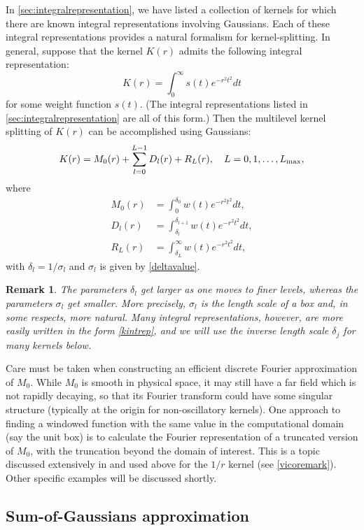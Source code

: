 \documentclass[final,letterpaper]{siamart171218}
\newtheorem{remark}[theorem]{Remark}
\newcommand{\be}{\begin{equation}}
\newcommand{\ee}{\end{equation}}
\newcommand{\ba}{\begin{aligned}}
\newcommand{\ea}{\end{aligned}}
\begin{document}
In \cref{sec:integralrepresentation}, we have listed a collection of
kernels for which there are known integral
representations involving Gaussians. Each of these integral representations provides a
natural formalism for kernel-splitting.
In general, suppose that the kernel $K(r)$ admits the following integral representation:
\be \label{kintrep}
K(r)=\int_0^\infty s(t)e^{-r^2t^2}dt
\ee
for some weight function $s(t)$.
(The integral representations
listed in \cref{sec:integralrepresentation} are all of this form.) 
Then the multilevel kernel splitting of $K(r)$ can be accomplished using Gaussians:
\be\label{generalkernelsplitting}
K(r)=M_0(r)+\sum_{l=0}^{L-1}D_l(r)+R_L(r), \quad L=0,1,\ldots,L_{\rm max},
\ee
where
\be
\ba
M_0(r)&=\int_0^{\delta_0}w(t)e^{-r^2t^2}dt,\\
D_l(r)&=\int_{\delta_{l}}^{\delta_{l+1}} w(t)e^{-r^2t^2}dt,\\
R_L(r)&=\int_{\delta_{L}}^\infty w(t)e^{-r^2t^2}dt,
\ea
\ee
with $\delta_l = 1/\sigma_l$ and $\sigma_l$ is given by \eqref{deltavalue}.

\begin{remark} \label{delta_vs_sigma}
The parameters $\delta_l$ get {\em larger} as one moves to finer levels,
whereas the parameters $\sigma_l$ get smaller. 
More precisely, 
$\sigma_l$ is the length scale of a box and, in some respects, more natural. 
Many integral representations, however,
are more easily written in the form \eqref{kintrep}, and we will use the inverse
length scale $\delta_j$ for many kernels below.
\end{remark}

Care must be taken when constructing an efficient discrete
Fourier approximation of $M_0$. While $M_0$ is smooth in  
physical space, it may still have a far field which is not rapidly decaying, so that
its Fourier transform could have some singular structure (typically at the origin for 
non-oscillatory kernels).
One approach to finding a windowed function with the same value in the computational
domain (say the unit box) is to calculate the Fourier representation of a truncated version
of $M_0$, with the truncation beyond the domain of interest.
This is a topic discussed extensively in \cite{vico2016jcp} and used 
above for the $1/r$ kernel (see \cref{vicoremark}). Other specific examples will be discussed
shortly.

\subsection{Sum-of-Gaussians approximation}
\end{document}
